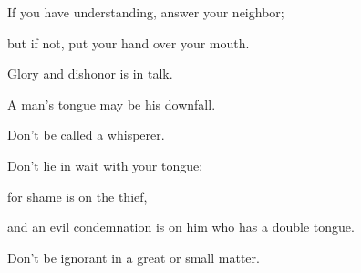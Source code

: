 {\par }{\Q {}If you have understanding, answer your neighbor;
\par }{\QB but if not, put your hand over your mouth.
\par }{\Q {}Glory and dishonor is in talk.
\par }{\QB A man’s tongue may be his downfall.
\par }{\Q {}Don’t be called a whisperer.
\par }{\QB Don’t lie in wait with your tongue;
\par }{\QB for shame is on the thief,
\par }{\QB and an evil condemnation is on him who has a double tongue.
\par }{\Q {}Don’t be ignorant in a great or small matter.

}
